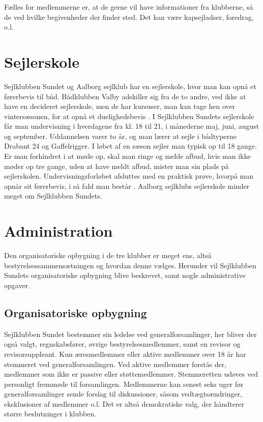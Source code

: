 Fælles for medlemmerne er, at de gerne vil have informationer fra klubberne, så de ved hvilke begivenheder der finder
sted. Det kan være kapsejladser, foredrag, o.l.


\section{Sejlerskole}\label{sec:sejlerskole}

Sejlklubben Sundet og Aalborg sejlklub har en sejlerskole, hvor man kan opnå et førerbevis til båd. Bådklubben Valby
adskiller sig fra de to andre, ved ikke at have en decideret sejlerskole, men de har kursuser, man kan tage hen over
vintersæsonen, for at opnå et duelighedsbevis \citep{baedklubben_valby_duelighedsbevis}. \newline 
I Sejlklubben Sundets sejlerskole får man undervisning i hverdagene fra kl. 18 til 21, i månederne maj, juni, august og
september. Uddannelsen varer to år, og man lærer at sejle i bådtyperne Drabant 24 og Gaffelrigger. I løbet af en sæson
sejler man typisk op til 18 gange. Er man forhindret i at møde op, skal man ringe og melde afbud, hvis man ikke møder op
tre gange, uden at have meldt afbud, mister man sin plads på sejlerskolen. Undervisningsforløbet afsluttes med en
praktisk prøve, hvorpå man opnår sit førerbevis, i så fald man består \citep{Sundet}. Aalborg sejlklubs sejlerskole
minder meget om Sejlklubben Sundets.


\section{Administration}\label{sec:organisatoriske-opbygning}

Den organisatoriske opbygning i de tre klubber er meget ens, altså bestyrelsessammensætningen og hvordan denne vælges. 
Herunder vil Sejlklubben Sundets organisatoriske opbygning blive beskrevet, samt nogle administrative opgaver.


\subsection{Organisatoriske opbygning}\label{subsec:organisatoriske-opbygning}

Sejlklubben Sundet bestemmer sin ledelse ved generalforsamlinger, her bliver der også valgt, regnskabsfører, øvrige
bestyrelsesmedlemmer, samt en revisor og revisorsuppleant. Kun æresmedlemmer eller aktive medlemmer over 18 år har
stemmeret ved generalforsamlingen. Ved aktive medlemmer forstås der, medlemmer som ikke er passive eller
støttemedlemmer. Stemmeretten udøves ved personligt fremmøde til forsamlingen. Medlemmerne kan senest seks uger før
generalforsamlinger sende forslag til diskussioner, såsom vedtægtsændringer, eksklusioner af medlemmer o.l. Det er altså
demokratiske valg, der håndterer større beslutninger i klubben.


